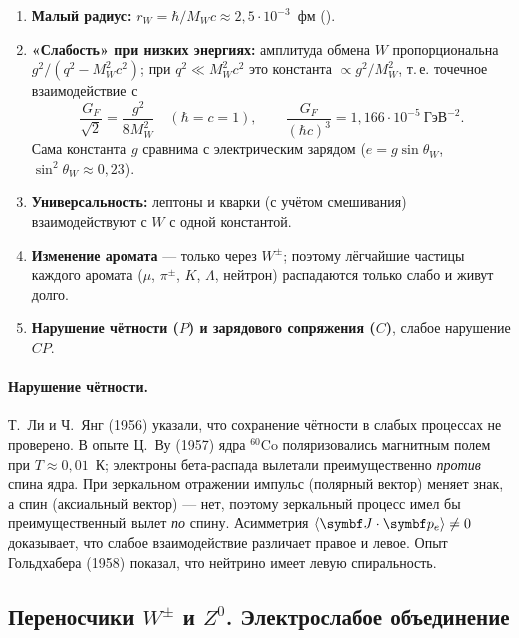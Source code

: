 \begin{enumerate}
 \item \textbf{Малый радиус:} $r_W=\hbar/M_Wc\approx2{,}5\cdot10^{-3}$~фм ().
 \item \textbf{«Слабость» при низких энергиях:} амплитуда обмена $W$ пропорциональна $g^2/(q^2-M_W^2c^2)$; при
       $q^2\ll M_W^2c^2$ это константа $\propto g^2/M_W^2$, т.\,е. точечное взаимодействие с
       \begin{equation}\label{eq:16:GF}
         \frac{G_F}{\sqrt2}=\frac{g^2}{8M_W^2}\quad(\hbar=c=1),\qquad \frac{G_F}{(\hbar c)^3}=1{,}166\cdot10^{-5}\ \text{ГэВ}^{-2}.
       \end{equation}
       Сама константа $g$ сравнима с электрическим зарядом ($e=g\sin\theta_W$, $\sin^2\theta_W\approx0{,}23$).
 \item \textbf{Универсальность:} лептоны и кварки (с учётом смешивания) взаимодействуют с $W$ с одной константой.
 \item \textbf{Изменение аромата} — только через $W^\pm$; поэтому лёгчайшие частицы каждого аромата
       ($\mu$, $\pi^\pm$, $K$, $\Lambda$, нейтрон) распадаются только слабо и живут долго.
 \item \textbf{Нарушение чётности ($P$) и зарядового сопряжения ($C$)}, слабое нарушение $CP$.
\end{enumerate}

\paragraph{Нарушение чётности.} Т.~Ли и Ч.~Янг (1956) указали, что сохранение чётности в слабых процессах не
проверено. В опыте Ц.~Ву (1957) ядра $^{60}$Co поляризовались магнитным полем при $T\approx0{,}01$~К; электроны
бета-распада вылетали преимущественно \emph{против} спина ядра. При зеркальном отражении импульс (полярный вектор) меняет
знак, а спин (аксиальный вектор) — нет, поэтому зеркальный процесс имел бы преимущественный вылет \emph{по} спину.
Асимметрия $\avg{\vect J\cdot\vect p_e}\neq0$ доказывает, что слабое взаимодействие различает правое и левое. Опыт Гольдхабера
(1958) показал, что нейтрино имеет левую спиральность.

\subsection{Переносчики \texorpdfstring{$W^\pm$ и $Z^0$}{W± и Z0}. Электрослабое объединение}

